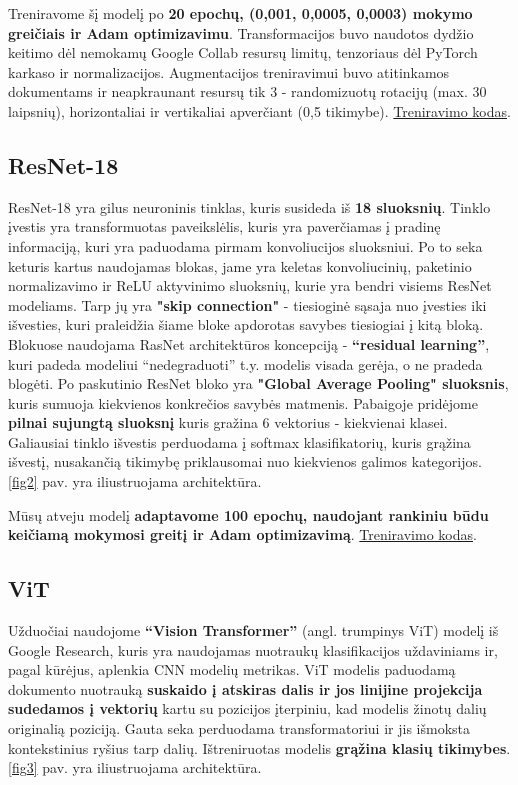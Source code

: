 \documentclass[conference]{IEEEtran}
\begin{document}
Treniravome šį modelį po \textbf{20 epochų, (0,001, 0,0005, 0,0003) mokymo greičiais ir Adam optimizavimu}. Transformacijos buvo naudotos dydžio keitimo dėl nemokamų Google Collab resursų limitų, tenzoriaus dėl PyTorch karkaso ir normalizacijos. Augmentacijos treniravimui buvo atitinkamos dokumentams ir neapkraunant resursų tik 3 - randomizuotų rotacijų (max. 30 laipsnių), horizontaliai ir vertikaliai apverčiant (0,5 tikimybe). \href{https://github.com/VU-MIF-SE/komandine-uzduotis-jje/blob/main/Sukurtas_CNN.ipynb}{Treniravimo kodas}. 


\subsection{ResNet-18}

ResNet-18 yra gilus neuroninis tinklas, kuris susideda iš \textbf{18 sluoksnių}. Tinklo įvestis yra transformuotas paveikslėlis, kuris yra paverčiamas į pradinę informaciją, kuri yra paduodama pirmam konvoliucijos sluoksniui. Po to seka keturis kartus naudojamas blokas, jame yra keletas konvoliucinių, paketinio normalizavimo ir ReLU aktyvinimo sluoksnių, kurie yra bendri visiems ResNet modeliams. Tarp jų yra \textbf{"skip connection"} - tiesioginė sąsaja nuo įvesties iki išvesties, kuri praleidžia šiame bloke apdorotas savybes tiesiogiai į kitą bloką. Blokuose naudojama RasNet architektūros koncepciją - \textbf{“residual learning”}, kuri padeda modeliui “nedegraduoti” t.y. modelis visada gerėja, o ne pradeda blogėti. Po paskutinio ResNet bloko yra \textbf{"Global Average Pooling" sluoksnis}, kuris sumuoja kiekvienos konkrečios savybės matmenis. Pabaigoje pridėjome \textbf{pilnai sujungtą sluoksnį} kuris gražina 6 vektorius - kiekvienai klasei. Galiausiai tinklo išvestis perduodama į softmax klasifikatorių, kuris grąžina išvestį, nusakančią tikimybę priklausomai nuo kiekvienos galimos kategorijos. \ref{fig2} pav. yra iliustruojama architektūra.

Mūsų atveju modelį \textbf{adaptavome 100 epochų, naudojant rankiniu būdu keičiamą mokymosi greitį ir Adam optimizavimą}. \href{https://github.com/VU-MIF-SE/komandine-uzduotis-jje/blob/main/resnet18.ipynb}{Treniravimo kodas}.

\subsection{ViT}

Užduočiai naudojome \textbf{“Vision Transformer”} (angl. trumpinys ViT) modelį iš Google Research, kuris yra naudojamas nuotraukų klasifikacijos uždaviniams ir, pagal kūrėjus, aplenkia CNN modelių metrikas. \cite{dosovitskiy2021image} ViT modelis paduodamą dokumento nuotrauką \textbf{suskaido į atskiras dalis ir jos linijine projekcija sudedamos į vektorių} kartu su pozicijos įterpiniu, kad modelis žinotų dalių originalią poziciją. Gauta seka perduodama transformatoriui ir jis išmoksta kontekstinius ryšius tarp dalių. Ištreniruotas modelis \textbf{grąžina klasių tikimybes}. \ref{fig3} pav. yra iliustruojama architektūra.
\end{document}
